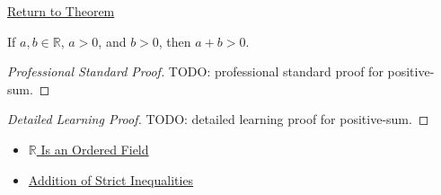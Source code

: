 \newpage
{}
\label{prf:positive-sum}

\begin{remark*}[Return]
\hyperref[lem:positive-sum]{Return to Theorem}
\end{remark*}

\begin{lemma*}
If $a,b\in\mathbb{R}$, $a>0$, and $b>0$, then $a+b>0$.
\end{lemma*}

\begin{proof}[Professional Standard Proof]
\LRAProofBodyStart
TODO: professional standard proof for positive-sum.
\end{proof}

\begin{proof}[Detailed Learning Proof]
\LRAProofBodyStart
TODO: detailed learning proof for positive-sum.
\end{proof}

\begin{remark*}
\end{remark*}

\begin{dependencies}
\begin{itemize}
  \item \hyperref[thm:r-is-an-ordered-field]{$\mathbb{R}$ Is an Ordered Field}
  \item \hyperref[thm:ineq-add-inequalities]{Addition of Strict Inequalities}
\end{itemize}
\end{dependencies}

\clearpage

